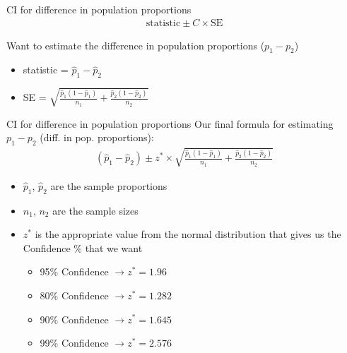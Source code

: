 \documentclass{beamer}
\begin{document}
\begin{frame}{CI for difference in population proportions}
\begin{align*}
    \text{statistic} \pm C \times \text{SE}
\end{align*}

Want to estimate the difference in population proportions ($p_1 - p_2$)
\begin{itemize}
    \item statistic = $\widehat{p}_1 - \widehat{p}_2$
\end{itemize} \vspace{8mm}

\begin{itemize}
    \item SE = $\sqrt{\frac{\widehat{p}_1(1-\widehat{p}_1)}{n_1} + \frac{\widehat{p}_2(1-\widehat{p}_2)}{n_2}}$
\end{itemize}
\end{frame}


\begin{frame}{CI for difference in population proportions}
Our final formula for estimating $p_1 - p_2$ (diff. in pop. proportions):
\begin{align*}
    (\widehat{p}_1 - \widehat{p}_2) \pm z^* \times \sqrt{\frac{\widehat{p}_1(1-\widehat{p}_1)}{n_1} + \frac{\widehat{p}_2(1-\widehat{p}_2)}{n_2}}
\end{align*}

\begin{itemize}
    \item $\widehat{p}_1$, $\widehat{p}_2$ are the sample proportions
    \item $n_1$, $n_2$ are the sample sizes
    \item $z^*$ is the appropriate value from the normal distribution that gives us the Confidence \% that we want
    \begin{itemize}
        \item 95\% Confidence $\rightarrow z^* = 1.96$
        \item 80\% Confidence $\rightarrow z^* = 1.282$
        \item 90\% Confidence $\rightarrow z^* = 1.645$
        \item 99\% Confidence $\rightarrow z^* = 2.576$
    \end{itemize}
\end{itemize}
\end{frame}
\end{document}
